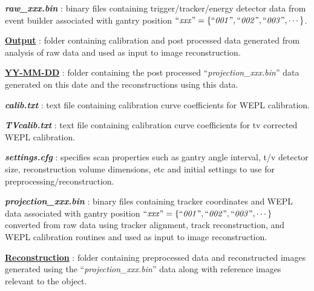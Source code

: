 \documentclass[landscape]{article}
\begin{document}
\begin{myEnumerate}[labelindent=0pt, leftmargin=*]
\begin{myEnumerate}[labelindent=1pt, leftmargin=*]
\begin{myEnumerate}[labelindent=1pt, leftmargin=*]
\begin{myEnumerate}[labelindent=1pt, leftmargin=*]
\begin{myEnumerate}[labelindent=1pt, leftmargin=*]
                    \begin{myEnumerate}[labelindent=1pt, leftmargin=*]
                        \item \textbf{\textit{raw\_xxx.bin}} : binary files containing trigger/tracker/energy detector data from event builder associated with gantry position $\textrm{``\textit{xxx}''} =\{\textrm{``\textit{001}''}, \textrm{``\textit{002}''}, \textrm{``\textit{003}''}, \cdots\}$.
                    \end{myEnumerate}
                    \item \ul{\textbf{Output}} : folder containing calibration and post processed data generated from analysis of raw data and used as input to image reconstruction.
                    \begin{myEnumerate}[labelindent=1pt, leftmargin=*]
                        \item \ul{\textbf{YY-MM-DD}} : folder containing the post processed ``\textit{projection\_xxx.bin}'' data generated on this date and the reconstructions using this data.
                        \begin{myEnumerate}[labelindent=1pt, leftmargin=*]
                            \item \textbf{\textit{calib.txt}} : text file containing calibration curve coefficients for WEPL calibration.
                            \item \textbf{\textit{TVcalib.txt}} : text file containing calibration curve coefficients for tv corrected WEPL calibration.
                            \item \textbf{\textit{settings.cfg}} : specifies scan properties such as gantry angle interval, t/v detector size, reconstruction volume dimensions, etc and initial settings to use for preprocessing/reconstruction.
                            \item \textbf{\textit{projection\_xxx.bin}} : binary files containing tracker coordinates and WEPL data associated with gantry position $\textrm{``\textit{xxx}''} =\{\textrm{``\textit{001}''}, \textrm{``\textit{002}''}, \textrm{``\textit{003}''}, \cdots\}$ converted from raw data using tracker alignment, track reconstruction, and WEPL calibration routines and used as input to image reconstruction.
                            \item \ul{\textbf{Reconstruction}} : folder containing preprocessed data and reconstructed images generated using the ``\textit{projection\_xxx.bin}'' data along with reference images relevant to the object.

\end{myEnumerate}
\end{myEnumerate}
\end{myEnumerate}
\end{myEnumerate}
\end{myEnumerate}
\end{myEnumerate}
\end{myEnumerate}
\end{document}
